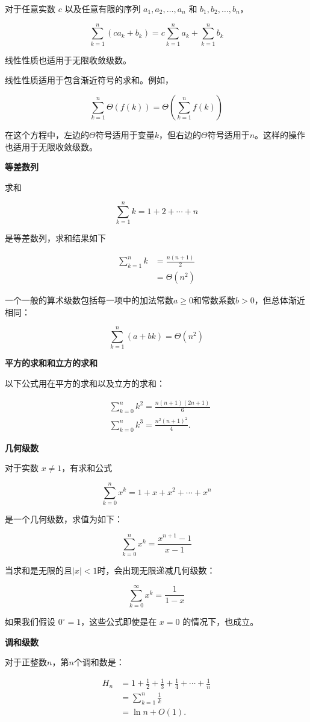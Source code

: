 \documentclass[lang=cn,newtx,10pt,scheme=chinese]{elegantbook}
\begin{document}
对于任意实数 $c$ 以及任意有限的序列 $a_1, a_2, \ldots, a_n$ 和 $b_1, b_2, \ldots, b_n$，

$$
\sum_{k=1}^n(c a_k+b_k)=c \sum_{k=1}^n a_k+\sum_{k=1}^n b_k
$$

线性性质也适用于无限收敛级数。

线性性质适用于包含渐近符号的求和。例如，

$$
\sum_{k=1}^n \Theta(f(k))=\Theta(\sum_{k=1}^n f(k))
$$

在这个方程中，左边的$\Theta$符号适用于变量$k$，但右边的$\Theta$符号适用于$n$。这样的操作也适用于无限收敛级数。

\textbf{等差数列}

求和

$$
\sum_{k=1}^n k=1+2+\cdots+n
$$

是等差数列，求和结果如下

$$
\begin{aligned}
\sum_{k=1}^n k & =\frac{n(n+1)}{2} \\
& =\Theta(n^2)
\end{aligned}
$$

一个一般的算术级数包括每一项中的加法常数$a \geq 0$和常数系数$b>0$，但总体渐近相同：

$$
\sum_{k=1}^n(a+b k)=\Theta(n^2)
$$

\textbf{平方的求和和立方的求和}

以下公式用在平方的求和以及立方的求和：

$$
\begin{aligned}
& \sum_{k=0}^n k^2=\frac{n(n+1)(2 n+1)}{6} \\
& \sum_{k=0}^n k^3=\frac{n^2(n+1)^2}{4} .
\end{aligned}
$$

\textbf{几何级数}

对于实数 $x \neq 1$，有求和公式

$$
\sum_{k=0}^n x^k=1+x+x^2+\cdots+x^n
$$

是一个几何级数，求值为如下：

$$
\sum_{k=0}^n x^k=\frac{x^{n+1}-1}{x-1}
$$

当求和是无限的且$|x|<1$时，会出现无限递减几何级数：

$$
\sum_{k=0}^{\infty} x^k=\frac{1}{1-x}
$$

如果我们假设 $0^{\circ}=1$，这些公式即使是在 $x=0$ 的情况下，也成立。

\textbf{调和级数}

对于正整数$n$，第$n$个调和数是：

$$
\begin{aligned}
H_n & =1+\frac{1}{2}+\frac{1}{3}+\frac{1}{4}+\cdots+\frac{1}{n} \\
& =\sum_{k=1}^n \frac{1}{k} \\
& =\ln n+O(1) .
\end{aligned}
$$
\end{document}
